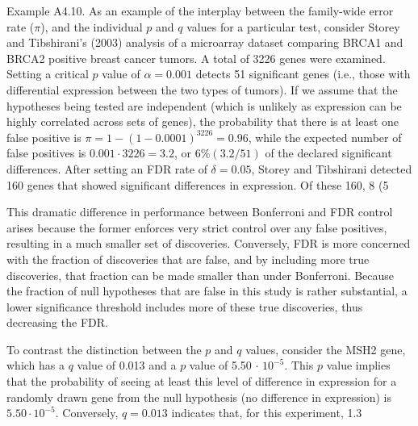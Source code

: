 \documentclass{article}
\begin{document}
Example A4.10. As an example of the interplay between the family-wide error rate ($\pi$), and the individual $p$ and $q$ values for a particular test, consider Storey and Tibshirani's (2003) analysis of a microarray dataset comparing BRCA1 and BRCA2 positive breast cancer tumors. A total of 3226 genes were examined. Setting a critical $p$ value of $\alpha = 0.001$ detects 51 significant genes (i.e., those with differential expression between the two types of tumors). If we assume that the hypotheses being tested are independent (which is unlikely as expression can be highly correlated across sets of genes), the probability that there is at least one false positive is $\pi = 1 - (1 - 0.0001)^{3226} = 0.96$, while the expected number of false positives is $0.001 \cdot 3226 = 3.2$, or $6\% (3.2 / 51)$ of the declared significant differences. After setting an FDR rate of $\delta = 0.05$, Storey and Tibshirani detected 160 genes that showed significant differences in expression. Of these 160, 8 (5%

This dramatic difference in performance between Bonferroni and FDR control arises because the former enforces very strict control over any false positives, resulting in a much smaller set of discoveries. Conversely, FDR is more concerned with the fraction of discoveries that are false, and by including more true discoveries, that fraction can be made smaller than under Bonferroni. Because the fraction of null hypotheses that are false in this study is rather substantial, a lower significance threshold includes more of these true discoveries, thus decreasing the FDR.

To contrast the distinction between the $p$ and $q$ values, consider the MSH2 gene, which has a $q$ value of 0.013 and a $p$ value of 5.50 $\cdot$ $10^{-5}$. This $p$ value implies that the probability of seeing at least this level of difference in expression for a randomly drawn gene from the null hypothesis (no difference in expression) is $5.50 \cdot 10^{-5}$. Conversely, $q = 0.013$ indicates that, for this experiment, 1.3%
\end{document}
